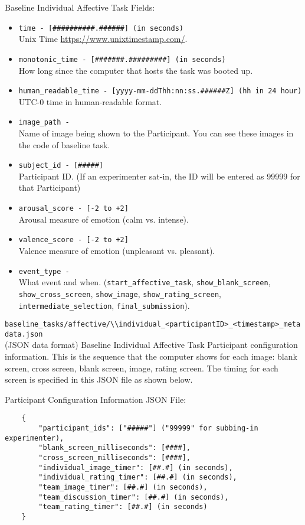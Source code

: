 \begin{description}
Baseline Individual Affective Task Fields:
\begin{itemize}
    \item \verb|time - [##########.######] (in seconds)|\\Unix Time \href{https://www.unixtimestamp.com/}{https://www.unixtimestamp.com/}.
    \item \verb|monotonic_time - [#######.#########] (in seconds)|\\How long since the computer that hosts the task was booted up.
    \item \verb|human_readable_time - [yyyy-mm-ddThh:nn:ss.######Z] (hh in 24 hour)|\\ UTC-0 time in human-readable format.
    \item \verb|image_path -|\\Name of image being shown to the Participant. You can see these images in the code of baseline task.
    \item \verb|subject_id - [#####]|\\Participant ID. (If an experimenter sat-in, the ID will be entered as 99999 for that Participant)
    \item \verb|arousal_score - [-2 to +2]|\\Arousal measure of emotion (calm vs. intense).
    \item \verb|valence_score - [-2 to +2]|\\Valence measure of emotion (unpleasant vs. pleasant).
    \item \verb|event_type -|\\What event and when.
        (\verb|start_affective_task|, \verb|show_blank_screen|,
        \verb|show_cross_screen|, \verb|show_image|, \verb|show_rating_screen|,
        \verb|intermediate_selection|, \verb|final_submission|).
\end{itemize}


\medskip
\item\verb|baseline_tasks/affective/\\individual_<participantID>_<timestamp>_metadata.json|\\
    (JSON data format)
Baseline Individual Affective Task Participant configuration information. This is the sequence that the computer shows for each image: blank screen, cross screen, blank screen, image, rating screen. The timing for each screen is specified in this JSON file as shown below.

Participant Configuration Information JSON File:
\begin{verbatim}
    {
        "participant_ids": ["#####"] ("99999" for subbing-in experimenter),
        "blank_screen_milliseconds": [####],
        "cross_screen_milliseconds": [####],
        "individual_image_timer": [##.#] (in seconds),
        "individual_rating_timer": [##.#] (in seconds),
        "team_image_timer": [##.#] (in seconds),
        "team_discussion_timer": [##.#] (in seconds),
        "team_rating_timer": [##.#] (in seconds)
    }
\end{verbatim}



\end{description}
